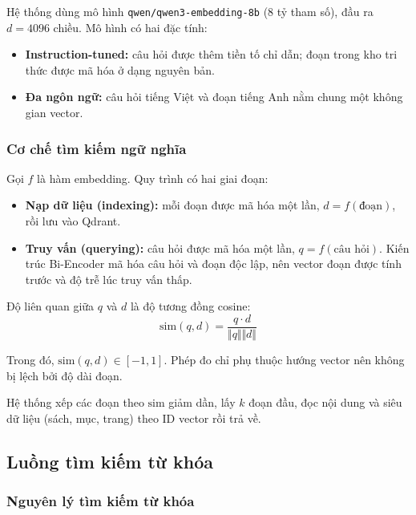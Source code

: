 Hệ thống dùng mô hình \texttt{qwen/qwen3-embedding-8b} (8 tỷ tham số), đầu ra $d=4096$ chiều. Mô hình có hai đặc tính:
\begin{itemize}
  \item \textbf{Instruction-tuned:} câu hỏi được thêm tiền tố chỉ dẫn; đoạn trong kho tri thức được mã hóa ở dạng nguyên bản.
  \item \textbf{Đa ngôn ngữ:} câu hỏi tiếng Việt và đoạn tiếng Anh nằm chung một không gian vector.
\end{itemize}

\subsubsection{Cơ chế tìm kiếm ngữ nghĩa}

Gọi $f$ là hàm embedding. Quy trình có hai giai đoạn:
\begin{itemize}
  \item \textbf{Nạp dữ liệu (indexing):} mỗi đoạn được mã hóa một lần, $d=f(\text{đoạn})$, rồi lưu vào Qdrant.
  \item \textbf{Truy vấn (querying):} câu hỏi được mã hóa một lần, $q=f(\text{câu hỏi})$. Kiến trúc Bi-Encoder mã hóa câu hỏi và đoạn độc lập, nên vector đoạn được tính trước và độ trễ lúc truy vấn thấp.
\end{itemize}

Độ liên quan giữa $q$ và $d$ là độ tương đồng cosine:
\begin{equation}
  \mathrm{sim}(q,d)=\frac{q\cdot d}{\Vert q\Vert \Vert d\Vert }
\end{equation}

Trong đó, $\mathrm{sim}(q,d)\in[-1,1]$. Phép đo chỉ phụ thuộc hướng vector nên không bị lệch bởi độ dài đoạn.

Hệ thống xếp các đoạn theo $\mathrm{sim}$ giảm dần, lấy $k$ đoạn đầu, đọc nội dung và siêu dữ liệu (sách, mục, trang) theo ID vector rồi trả về.


\subsection{Luồng tìm kiếm từ khóa}
\label{sec:luong-tu-khoa}

\subsubsection{Nguyên lý tìm kiếm từ khóa}

